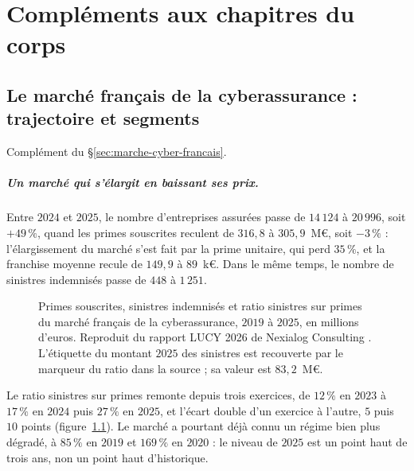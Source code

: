 \chapter{Compléments aux chapitres du corps}
\label{chap:complements}

\section{Le marché français de la cyberassurance : trajectoire et segments}
\label{sec:ann-lucy}


Complément du \S\ref{sec:marche-cyber-francais}.

\paragraph{Un marché qui s'élargit en baissant ses prix.} Entre $2024$ et $2025$, le nombre
d'entreprises assurées passe de $14\,124$ à $20\,996$, soit $+49\,\%$, quand les primes
souscrites reculent de $316{,}8$ à $305{,}9$~M\euro, soit $-3\,\%$ : l'élargissement du marché
s'est fait par la prime unitaire, qui perd $35\,\%$, et la franchise moyenne recule de
$149{,}9$ à $89$~k\euro. Dans le même temps, le nombre de sinistres indemnisés passe de $448$ à
$1\,251$.

\begin{figure}[htbp]
\centering
{}
\caption[Primes, sinistres et ratio du marché français de la cyberassurance]{Primes souscrites,
sinistres indemnisés et ratio sinistres sur primes du marché français de la cyberassurance,
$2019$ à $2025$, en millions d'euros. Reproduit du rapport LUCY 2026 de Nexialog Consulting
\citep{RapiorKaddouri2026}. L'étiquette du montant $2025$ des sinistres est recouverte par le
marqueur du ratio dans la source ; sa valeur est $83{,}2$~M\euro.}
\label{fig:lucy-sp}
\end{figure}

\noindent Le ratio sinistres sur primes remonte depuis trois exercices, de $12\,\%$ en $2023$ à
$17\,\%$ en $2024$ puis $27\,\%$ en $2025$, et l'écart double d'un exercice à l'autre, $5$ puis
$10$ points (figure~\ref{fig:lucy-sp}). Le marché a pourtant déjà connu un régime bien plus
dégradé, à $85\,\%$ en $2019$ et $169\,\%$ en $2020$ : le niveau de $2025$ est un point haut de
trois ans, non un point haut d'historique.

